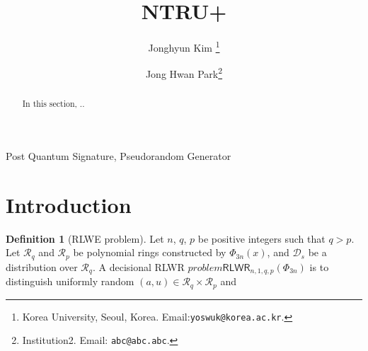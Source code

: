 \documentclass[11pt, letterpaper]{article}
\title{NTRU+}
\author{ Jonghyun Kim \footnote{Korea University, Seoul, Korea.
        Email:\texttt{yoswuk@korea.ac.kr}.}
    \and Jong Hwan Park\footnote{Institution2. Email: \texttt{abc@abc.abc}.} }
\newcommand{\vs}{\vspace{1.5mm}}
\theoremstyle{definition}
\newtheorem{definition}[theorem]{Definition}
\begin{document}
\maketitle
\date{}

\begin{abstract} In this section, ..
\end{abstract}

\vs {} Post Quantum Signature, Pseudorandom Generator

\section{Introduction}

\begin{definition}[RLWE problem]
    Let $n$, $q$, $p$ be positive integers such that $q > p$. Let $\mathcal{R}_q$
    and $\mathcal{R}_p$ be polynomial rings constructed by $\Phi_{3n}(x)$, and
    $\mathcal{D}_s$ be a distribution over $\mathcal{R}_q$. A decisional RLWR
    $problem \mathsf{RLWR}_{n,1,q,p}(\Phi_{3n})$ is to distinguish uniformly
    random $(a, u) \in \mathcal{R}_q \times \mathcal{R}_p$ and
\end{definition}

\begin{comment}
    $(a, b = \round{\frac{p}{q} a \cdot s}) \in \mathcal{R}_q

    \times \mathcal{R}_p$ where $\vc{s}$ is sampled from $\mathcal{D}_s$. Then,
    the advantage of an adversary $\mathcal{A}$ in solving the decisional RLWR
    problem $\mathsf{RLWR}_{n,1,q,p}(\mathcal{D}_s)$ is defined as follows:
    \begin{center}
        $\Adv^\mathcal{RLWR}_{n,1,q,p}(\mathcal{A}) =  \Pr[\mathcal{A}(a, b) = 1] - \Pr[\mathcal{A}(a, u) = 1]$.
    \end{center}   
\end{comment}
\end{document}
